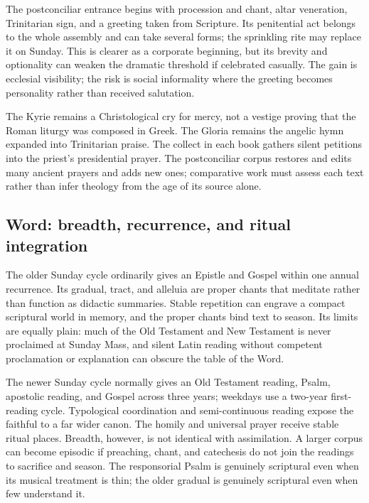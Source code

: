 The postconciliar entrance begins with procession and chant, altar veneration, Trinitarian sign, and a greeting taken from Scripture. Its penitential act belongs to the whole assembly and can take several forms; the sprinkling rite may replace it on Sunday. This is clearer as a corporate beginning, but its brevity and optionality can weaken the dramatic threshold if celebrated casually. The gain is ecclesial visibility; the risk is social informality where the greeting becomes personality rather than received salutation.

The Kyrie remains a Christological cry for mercy, not a vestige proving that the Roman liturgy was composed in Greek. The Gloria remains the angelic hymn expanded into Trinitarian praise. The collect in each book gathers silent petitions into the priest's presidential prayer. The postconciliar corpus restores and edits many ancient prayers and adds new ones; comparative work must assess each text rather than infer theology from the age of its source alone.

\subsection{Word: breadth, recurrence, and ritual integration}

The older Sunday cycle ordinarily gives an Epistle and Gospel within one annual recurrence. Its gradual, tract, and alleluia are proper chants that meditate rather than function as didactic summaries. Stable repetition can engrave a compact scriptural world in memory, and the proper chants bind text to season. Its limits are equally plain: much of the Old Testament and New Testament is never proclaimed at Sunday Mass, and silent Latin reading without competent proclamation or explanation can obscure the table of the Word.

The newer Sunday cycle normally gives an Old Testament reading, Psalm, apostolic reading, and Gospel across three years; weekdays use a two-year first-reading cycle. Typological coordination and semi-continuous reading expose the faithful to a far wider canon. The homily and universal prayer receive stable ritual places. Breadth, however, is not identical with assimilation. A larger corpus can become episodic if preaching, chant, and catechesis do not join the readings to sacrifice and season. The responsorial Psalm is genuinely scriptural even when its musical treatment is thin; the older gradual is genuinely scriptural even when few understand it.

